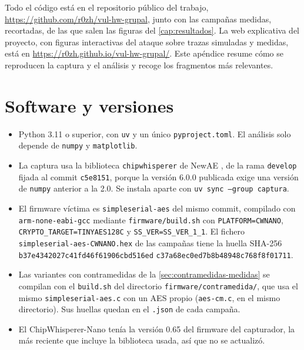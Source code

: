 \label{anx:codigo}

Todo el código está en el repositorio público del trabajo,
\url{https://github.com/r0zh/vul-hw-grupal}, junto con las campañas medidas,
recortadas, de las que salen las figuras del \cref{cap:resultados}. La web
explicativa del proyecto, con figuras interactivas del ataque sobre trazas
simuladas y medidas, está en \url{https://r0zh.github.io/vul-hw-grupal/}.
Este apéndice resume cómo se
reproducen la captura y el análisis y recoge los fragmentos más relevantes.

\section{Software y versiones}

\begin{itemize}
  \item Python 3.11 o superior, con \texttt{uv} y un único
    \texttt{pyproject.toml}. El análisis solo depende de \texttt{numpy} y
    \texttt{matplotlib}.
  \item La captura usa la biblioteca \texttt{chipwhisperer} de NewAE
    \cite{cw-repo}, de la rama \texttt{develop} fijada al commit
    \texttt{c5e8151}, porque la versión 6.0.0 publicada exige una versión de
    \texttt{numpy} anterior a la 2.0. Se instala aparte con
    \texttt{uv sync --group captura}.
  \item El firmware víctima es \texttt{simpleserial-aes} del mismo commit,
    compilado con \texttt{arm-}\allowbreak\texttt{none-}\allowbreak\texttt{eabi-gcc} mediante
    \texttt{firmware/}\allowbreak\texttt{build.sh} con \texttt{PLATFORM=CWNANO},
    \texttt{CRYPTO\_TARGET=}\allowbreak\texttt{TINYAES128C} y
    \texttt{SS\_VER=SS\_VER\_1\_1}.
    El fichero \texttt{simpleserial-aes-}\allowbreak\texttt{CWNANO.hex} de las
    campañas tiene la
    huella SHA-256
    \texttt{b37e4342027c41fd}\allowbreak\texttt{46f61906cbd516ed}\allowbreak
    \texttt{c37a68ec0ed7b8b4}\allowbreak\texttt{8948c768f8f01711}.
  \item Las variantes con contramedidas de la \cref{sec:contramedidas-medidas}
    se compilan con el \texttt{build.sh} del directorio
    \texttt{firmware/}\allowbreak\texttt{contramedida/}, que usa el mismo
    \texttt{simpleserial-aes.c} con un AES propio (\texttt{aes-cm.c}, en el
    mismo directorio). Sus huellas quedan en el \texttt{.json} de cada
    campaña.
  \item El ChipWhisperer-Nano tenía la versión 0.65 del firmware del
    capturador, la más reciente que incluye la biblioteca usada, así que no se
    actualizó.
\end{itemize}


